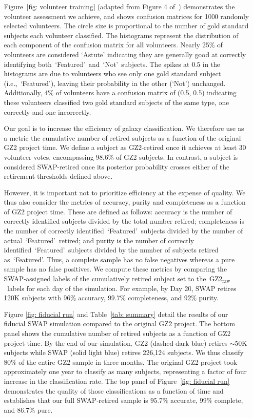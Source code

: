 \documentclass[twocolumn]{aastex6}
\newcommand{\feat}{`Featured'}
\newcommand{\notfeat}{`Not'}
\newcommand{\raw}{GZ2$_{\text{raw}}$}
\begin{document}
Figure~\ref{fig: volunteer training} (adapted from Figure 4 of~\citealt{Marshall2016})
demonstrates the volunteer assessment we achieve, and shows confusion matrices 
 for 1000 randomly selected volunteers. The circle size is proportional to the number of 
gold standard subjects each volunteer classified. 
The histograms represent the distribution of each component
of the confusion matrix for all volunteers.
 Nearly 25\% of volunteers are considered `Astute'  indicating
they are generally good at correctly identifying both~\feat~and~\notfeat~subjects.
The spikes at $0.5$ in the histograms are due to volunteers who see only one 
gold standard subject (i.e.,~\feat), leaving their probability in the 
other (\notfeat) unchanged.
Additionally, 4\% of volunteers have a confusion matrix of (0.5, 0.5) indicating these 
volunteers classified two gold standard subjects of the same type, one correctly and 
one incorrectly. 

Our goal is to increase the efficiency of galaxy classification. We therefore
 use as a metric the cumulative number of retired subjects
as a function of the original GZ2 project time.
We define a subject as GZ2-retired once it achieves at least 30 volunteer votes, 
encompassing 98.6\% of GZ2 subjects.
In contrast, a subject is considered SWAP-retired once its posterior 
probability crosses either of the retirement thresholds defined above. 

However, it is important not to prioritize efficiency at the expense of quality. 
We thus also consider the metrics of accuracy, 
purity and completeness as a function of GZ2 project time.  These are 
defined as follows: accuracy is the number of correctly
identified subjects divided by the total number retired; completeness is the number of 
correctly identified~\feat~subjects divided by the number of actual~\feat~retired; 
and purity is the number of correctly identified~\feat~subjects divided by 
the number of subjects retired as~\feat. Thus, a complete sample has no false
negatives whereas a pure sample has no false positives. 
We compute these metrics by comparing the SWAP-assigned labels of the cumulatively 
retired subject set to the~\raw~labels for each day of the simulation. 
For example, by Day 20, SWAP retires 120K subjects with 96\% accuracy,
 99.7\% completeness, and 92\% purity. 

Figure \ref{fig: fiducial run} and Table~\ref{tab: summary} detail the results of 
our fiducial SWAP simulation compared to the original GZ2 project. 
The bottom panel shows the cumulative number of retired subjects as a function of 
GZ2 project time. By the end of our simulation, GZ2 (dashed dark blue)
 retires $\sim$50K subjects while SWAP (solid light blue) retires 226,124 subjects.  
We thus classify 80\% of the entire GZ2 sample in three months. 
The original GZ2 project took approximately one year to classify as many subjects, 
representing a factor of four increase in the classification rate.  
The top panel of Figure~\ref{fig: fiducial run} demonstrates the quality of 
those classifications as a function of time and establishes that our full 
SWAP-retired sample is 95.7\% accurate, 99\% complete, and 86.7\% pure.
\end{document}
